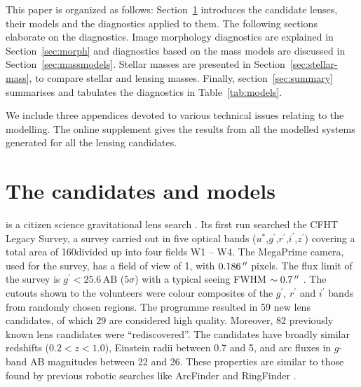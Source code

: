 This paper is organized as follows:
Section~\ref{sec:candidates_models} introduces the candidate lenses,
their models and the diagnostics applied to them.  The following
sections elaborate on the diagnostics.  Image morphology diagnostics
are explained in Section~\ref{sec:morph} and diagnostics based on the
mass models are discussed in Section~\ref{sec:massmodels}.  Stellar masses are
presented in Section~\ref{sec:stellar-mass}, to compare stellar and
lensing masses.  Finally, section~\ref{sec:summary}
summarises and tabulates the diagnostics in Table~\ref{tab:models}.

We include three appendices devoted to various technical issues
relating to the modelling.  The online supplement gives the results
from all the modelled systems generated for all the lensing
candidates.

\section{The candidates and models}
\label{sec:candidates_models}

\SW is a citizen science gravitational lens search
\citep{2016MNRAS.455.1171M}.  Its first run searched the CFHT Legacy
Survey, a survey carried out in five optical bands
($u^*$,$g^\prime$,$r^\prime$,$i^\prime$,$z^\prime$) covering a total
area of 160\sqdeg divided up into four fields W1 -- W4.  The
MegaPrime camera, used for the survey, has a field of view of
1\sqdeg, with $0.186\,^{\prime\prime}$ pixels. The flux limit of the
survey is $g^\prime<25.6\,\text{AB}$ ($5 \sigma$) with a typical seeing
FWHM $\sim 0.7\,^{\prime\prime}$ \citep{2013MNRAS.433.2545E}. The cutouts
shown to the volunteers were colour composites of the $g^\prime$,
$r^\prime$ and $i^\prime$ bands from randomly chosen regions.
The programme resulted in 59 new lens candidates, of which 29 are
considered high quality.
Moreover, 82 previously known lens candidates were ``rediscovered''.
The candidates have broadly similar redshifts ($0.2<z<1.0$), Einstein
radii between 0.7 and 5\arcsec, and arc fluxes in $g$-band AB
magnitudes between 22 and 26. These properties are
similar to those found by previous robotic searches like ArcFinder and
RingFinder \citep{2016MNRAS.455.1191M}.


